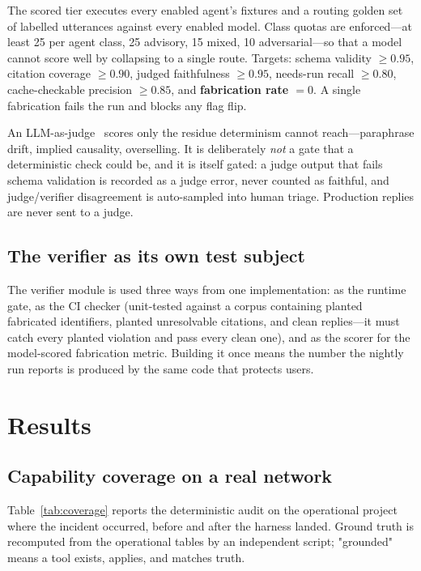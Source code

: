 \documentclass[conference]{IEEEtran}
\begin{document}
The scored tier executes every enabled agent's fixtures and a routing golden set
of \GoldenRows{} labelled utterances against every enabled model. Class quotas
are enforced---at least 25 per agent class, 25 advisory, 15 mixed, 10
adversarial---so that a model cannot score well by collapsing to a single route.
Targets: schema validity $\geq 0.95$, citation coverage $\geq 0.90$, judged
faithfulness $\geq 0.95$, needs-run recall $\geq 0.80$, cache-checkable precision
$\geq 0.85$, and \textbf{fabrication rate $= 0$}. A single fabrication fails the
run and blocks any flag flip.

An LLM-as-judge~\cite{zheng2023judge} scores only the residue determinism cannot
reach---paraphrase drift, implied causality, overselling. It is deliberately
\emph{not} a gate that a deterministic check could be, and it is itself gated: a
judge output that fails schema validation is recorded as a judge error, never
counted as faithful, and judge/verifier disagreement is auto-sampled into human
triage. Production replies are never sent to a judge.

\subsection{The verifier as its own test subject}

The verifier module is used three ways from one implementation: as the runtime
gate, as the CI checker (unit-tested against a corpus containing planted
fabricated identifiers, planted unresolvable citations, and clean replies---it
must catch every planted violation and pass every clean one), and as the scorer
for the model-scored fabrication metric. Building it once means the number the
nightly run reports is produced by the same code that protects users.

\section{Results}
\label{sec:results}

\subsection{Capability coverage on a real network}

Table~\ref{tab:coverage} reports the deterministic audit on the operational project
where the incident occurred, before and after the harness landed. Ground truth
is recomputed from the operational tables by an independent script; "grounded"
means a tool exists, applies, and matches truth.
\end{document}
